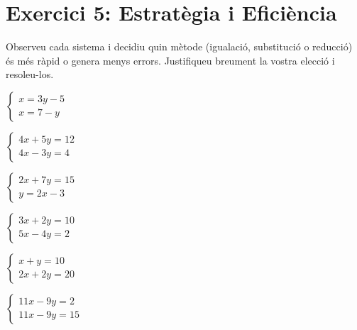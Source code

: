 \documentclass[12pt,a4paper]{article}
\begin{document}
\section*{Exercici 5: Estratègia i Eficiència}
Observeu cada sistema i decidiu quin mètode (igualació, substitució o reducció) és més ràpid o genera menys errors. Justifiqueu breument la vostra elecció i resoleu-los.

\begin{enumerate}[label=\alph*), itemsep=1cm]
    \begin{minipage}[t]{0.45\textwidth}
    \item $\begin{cases} x = 3y - 5 \\ x = 7 - y \end{cases}$ \\
    \item $\begin{cases} 4x + 5y = 12 \\ 4x - 3y = 4 \end{cases}$\\
    \item $\begin{cases} 2x + 7y = 15 \\ y = 2x - 3 \end{cases}$\\
    \end{minipage}
    \begin{minipage}[t]{0.45\textwidth}
    \item $\begin{cases} 3x + 2y = 10 \\ 5x - 4y = 2 \end{cases}$ \\
    \item $\begin{cases} x + y = 10 \\ 2x + 2y = 20 \end{cases}$ \\
    \item $\begin{cases} 11x - 9y = 2 \\ 11x - 9y = 15 \end{cases}$\\
    \end{minipage}
\end{enumerate}
\end{document}
